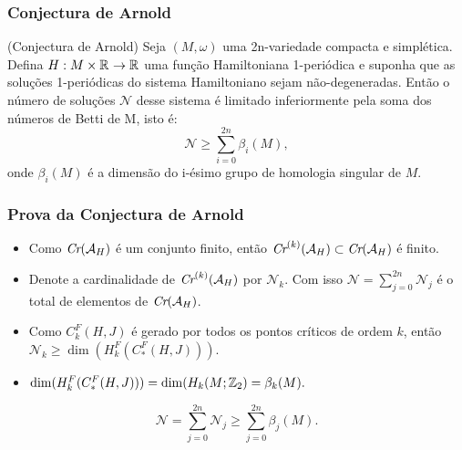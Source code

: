 \documentclass{beamer}
\begin{document}
	
	\begin{frame}
		\frametitle{Conjectura de Arnold}
		\begin{footnotesize}
			
			\begin{teorema}
				(Conjectura de Arnold) Seja $(M,\omega)$ uma 2n-variedade compacta e simplética. Defina $H:M\times \mathbb{R}^{} \to \mathbb{R}^{}$ uma função Hamiltoniana 1-periódica e suponha que as soluções 1-periódicas do sistema Hamiltoniano sejam não-degeneradas. Então o número de soluções $\mathcal{N}$ desse sistema é limitado inferiormente pela soma dos números de Betti de M, isto é:
				$$
				\mathcal{N}\geq \sum_{i=0}^{2n}\beta_{i}(M),
				$$
				onde $\beta_{i}(M)$ é a dimensão do i-ésimo grupo de homologia singular de $M$.
			\end{teorema}
		\end{footnotesize}
	\end{frame}
	
	
	\begin{frame}
		\frametitle{Prova da Conjectura de Arnold}
		\begin{footnotesize}
			
			\begin{prova}
				\begin{itemize}
					\item Como $\textit{Cr}(\mathcal{A}_{H})$ é um conjunto finito, então $\textit{Cr}^{(k)}(\mathcal{A}_{H}) \subset \textit{Cr}(\mathcal{A}_{H})$ é finito.
					
					\item Denote a cardinalidade de $\textit{Cr}^{(k)}(\mathcal{A}_{H})$ por $\mathcal{N}_{k}$. Com isso $\mathcal{N} =\sum_{j=0}^{2n} \mathcal{N}_{j}$ é o total de elementos de $\textit{Cr}(\mathcal{A}_{H})$.
					
					\item  Como $C^{F}_{k}(H,J)$ é gerado por todos os pontos críticos de ordem $k$, então $\mathcal{N}_{k}\geq \dim(	H^{F}_{k}(C^{F}_{*}(H,J)))$. 
					
					\item $\dim(	H^{F}_{k}(C^{F}_{*}(H,J)))  = \dim(	H_{k}(M;\mathbb{Z}_{2}) = \beta_{k}(M).$
				\end{itemize} 
				$$
				\mathcal{N} =\sum_{j=0}^{2n} \mathcal{N}_{j} \geq \sum_{j=0}^{2n} \beta_{j}(M).
				$$
				
			\end{prova}
			
		\end{footnotesize}
	\end{frame}
	
\end{document}
